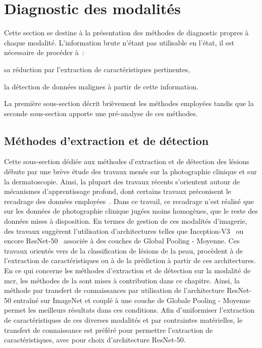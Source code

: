 \section{Diagnostic des modalités}
\label{sec:modality_diagnosis}
Cette section se destine à la présentation des méthodes de diagnostic propres à chaque modalité. L'information brute n'étant pas utilisable en l'état, il est nécessaire de procéder à~:
\begin{inlinerate}
    \item sa réduction par l'extraction de caractéristiques pertinentes,
    \item la détection de données malignes à partir de cette information.
\end{inlinerate} La première sous-section décrit brièvement les méthodes employées tandis que la seconde sous-section apporte une pré-analyse de ces méthodes.\par

\subsection{Méthodes d'extraction et de détection}
Cette sous-section dédiée aux méthodes d'extraction et de détection des lésions débute par une brève étude des travaux menés sur la photographie clinique et sur la dermatoscopie. Ainsi, la plupart des travaux récents s'orientent autour de mécanismes d'apprentissage profond, dont certains travaux préconisent le recadrage des données employées~\cite{Li2018}. Dans ce travail, ce recadrage n'est réalisé que sur les données de photographie clinique jugées moins homogènes, que le reste des données mises à disposition. En termes de gestion de ces modalités d'imagerie, des travaux suggèrent l'utilisation d'architectures telles que Inception-V3~\cite{Esteva2017,Fan2020} ou encore ResNet-50~\cite{Xie2018, Alantari2018} associée à des couches de Global Pooling - Moyenne. Ces travaux orientés vers de la classification de lésions de la peau, procèdent à de l'extraction de caractéristiques ou à de la prédiction à partir de ces architectures. En ce qui concerne les méthodes d'extraction et de détection sur la modalité de \gls{mcr}, les méthodes de la  sont mises à contribution dans ce chapitre. Ainsi, la méthode par transfert de connaissances par utilisation de l'architecture ResNet-50 entraîné sur ImageNet et couplé à une couche de Globale Pooling - Moyenne permet les meilleurs résultats dans ces conditions. Afin d'uniformiser l'extraction de caractéristiques de ces diverses modalités et par contraintes matérielles, le transfert de connaissance est préféré pour permettre l'extraction de caractéristiques, avec pour choix d'architecture ResNet-50.\par

